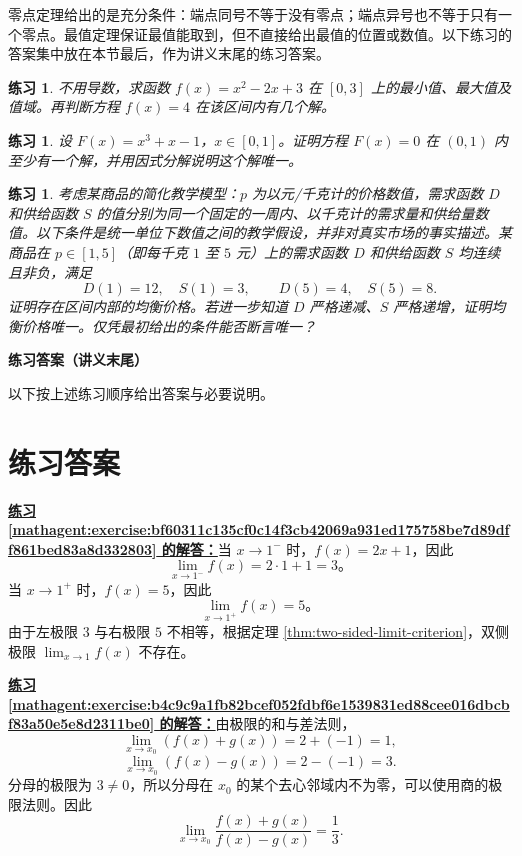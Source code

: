 \documentclass[UTF8,fontset=fandol,11pt]{ctexart}
\newtheorem{exercise}[definition]{练习}
\begin{document}
零点定理给出的是充分条件：端点同号不等于没有零点；端点异号也不等于只有一个零点。最值定理保证最值能取到，但不直接给出最值的位置或数值。以下练习的答案集中放在本节最后，作为讲义末尾的练习答案。\par
\begin{exercise}
\label{mathagent:exercise:8df9c883175539781c5297e80328cb621961e5226b4ee75741c01793ba96210d}
不用导数，求函数 $f(x)=x^2-2x+3$ 在 $[0,3]$ 上的最小值、最大值及值域。再判断方程 $f(x)=4$ 在该区间内有几个解。
\end{exercise}
\begin{exercise}
\label{mathagent:exercise:15f24ef1d79299958d598c18e2c5f872d77ddb70db01666a2348f05d38173ea8}
设 $F(x)=x^3+x-1$，$x\in[0,1]$。证明方程 $F(x)=0$ 在 $(0,1)$ 内至少有一个解，并用因式分解说明这个解唯一。
\end{exercise}
\begin{exercise}
\label{mathagent:exercise:14eff0c9afb4ff01b5d129f61082fbaf47f00da9185eedc3ed8874ad925b6e49}
考虑某商品的简化教学模型：$p$ 为以元/千克计的价格数值，需求函数 $D$ 和供给函数 $S$ 的值分别为同一个固定的一周内、以千克计的需求量和供给量数值。以下条件是统一单位下数值之间的教学假设，并非对真实市场的事实描述。某商品在 $p\in[1,5]$（即每千克 $1$ 至 $5$ 元）上的需求函数 $D$ 和供给函数 $S$ 均连续且非负，满足
\[
D(1)=12,\quad S(1)=3,\qquad D(5)=4,\quad S(5)=8.
\]
证明存在区间内部的均衡价格。若进一步知道 $D$ 严格递减、$S$ 严格递增，证明均衡价格唯一。仅凭最初给出的条件能否断言唯一？
\end{exercise}
\textbf{练习答案（讲义末尾）}

以下按上述练习顺序给出答案与必要说明。\par
\section*{练习答案}
\par\noindent\textbf{\hyperref[mathagent:exercise:bf60311c135cf0c14f3cb42069a931ed175758be7d89dff861bed83a8d332803]{练习 \ref*{mathagent:exercise:bf60311c135cf0c14f3cb42069a931ed175758be7d89dff861bed83a8d332803} 的解答：}}当 $x\to1^-$ 时，$f(x)=2x+1$，因此
\[
\lim_{x\to1^-}f(x)=2\cdot1+1=3\text{。}
\]
当 $x\to1^+$ 时，$f(x)=5$，因此
\[
\lim_{x\to1^+}f(x)=5\text{。}
\]
由于左极限 $3$ 与右极限 $5$ 不相等，根据定理 \ref{thm:two-sided-limit-criterion}，双侧极限 $\lim_{x\to1}f(x)$ 不存在。\par
\par\noindent\textbf{\hyperref[mathagent:exercise:b4c9c9a1fb82bcef052fdbf6e1539831ed88cee016dbcbf83a50e5e8d2311be0]{练习 \ref*{mathagent:exercise:b4c9c9a1fb82bcef052fdbf6e1539831ed88cee016dbcbf83a50e5e8d2311be0} 的解答：}}由极限的和与差法则，
\[
\lim_{x\to x_0}(f(x)+g(x))=2+(-1)=1,
\]
\[
\lim_{x\to x_0}(f(x)-g(x))=2-(-1)=3.
\]
分母的极限为 $3\neq0$，所以分母在 $x_0$ 的某个去心邻域内不为零，可以使用商的极限法则。因此
\[
\lim_{x\to x_0}\frac{f(x)+g(x)}{f(x)-g(x)}=\frac{1}{3}.
\]
\end{document}
